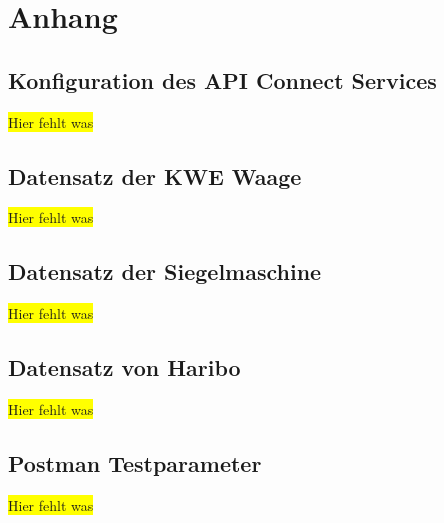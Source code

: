 \chapter{Anhang}
\label{ch:anhang}

\section{Konfiguration des API Connect Services}
\colorbox{yellow}{Hier fehlt was}

\section{Datensatz der KWE Waage}
\label{sec:scaleData}
\colorbox{yellow}{Hier fehlt was}

\section{Datensatz der Siegelmaschine}
\label{sec:hariboData}
\colorbox{yellow}{Hier fehlt was}

\section{Datensatz von Haribo}
\label{sec:hariboData}
\colorbox{yellow}{Hier fehlt was}

\section{Postman Testparameter}
\label{sec:postmanTestparameter}
\colorbox{yellow}{Hier fehlt was}